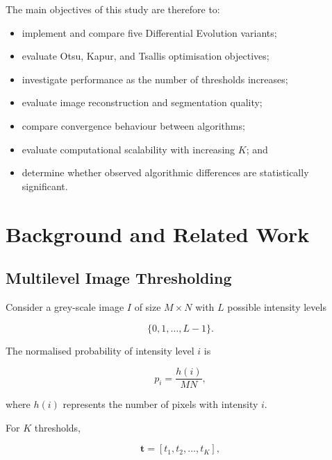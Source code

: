 \documentclass[review]{elsarticle}
\begin{document}
The main objectives of this study are therefore to:

\begin{itemize}
    \item implement and compare five Differential Evolution variants;
    \item evaluate Otsu, Kapur, and Tsallis optimisation objectives;
    \item investigate performance as the number of thresholds increases;
    \item evaluate image reconstruction and segmentation quality;
    \item compare convergence behaviour between algorithms;
    \item evaluate computational scalability with increasing $K$; and
    \item determine whether observed algorithmic differences are
          statistically significant.
\end{itemize}





\section{Background and Related Work}
\label{sec:background}


\subsection{Multilevel Image Thresholding}

Consider a grey-scale image $I$ of size $M \times N$ with
$L$ possible intensity levels

\begin{equation}
\{0,1,\ldots,L-1\}.
\end{equation}

The normalised probability of intensity level $i$ is

\begin{equation}
p_i =
\frac{h(i)}{M N},
\end{equation}

where $h(i)$ represents the number of pixels with intensity $i$.

For $K$ thresholds,

\begin{equation}
\mathbf{t} =
[t_1,t_2,\ldots,t_K],
\end{equation}
\end{document}
